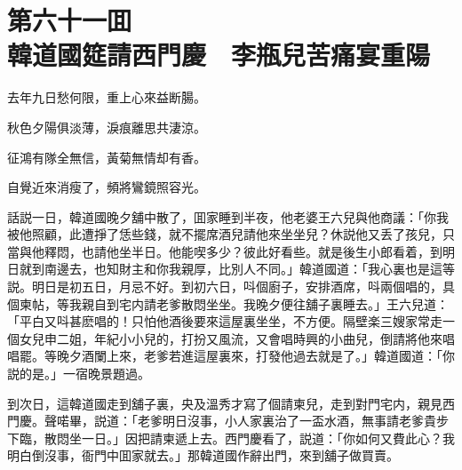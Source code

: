 
\chapter*{第六十一囬　\\韓道國筵請西門慶　李瓶兒苦痛宴重陽}


\begin{myquote}
去年九日愁何限，重上心來益断腸。

秋色夕陽俱淡薄，淚痕離思共淒涼。

征鴻有隊全無信，黃菊無情却有香。

自覺近來消瘦了，頻將鸞鏡照容光。
\end{myquote}

話説一日，韓道國晚夕舖中散了，囬家睡到半夜，他老婆王六兒與他商議：「你我被他照顧，此遭掙了恁些錢，就不擺席酒兒請他來坐坐兒？休説他又丢了孩兒，只當與他釋悶，也請他坐半日。他能喫多少？彼此好看些。就是後生小郎看着，到明日就到南邊去，也知財主和你我親厚，比別人不同。」韓道國道：「我心裏也是這等説。明日是初五日，月忌不好。到初六日，呌個廚子，安排酒席，呌兩個唱的，具個柬帖，等我親自到宅内請老爹散悶坐坐。我晚夕便往舖子裏睡去。」王六兒道：「平白又呌甚麽唱的！只怕他酒後要來這屋裏坐坐，不方便。隔壁楽三嫂家常走一個女兒申二姐，年紀小小兒的，打扮又風流，又會唱時興的小曲兒，倒請將他來唱唱罷。等晚夕酒闌上來，老爹若進這屋裏來，打發他過去就是了。」韓道國道：「你説的是。」一宿晚景題過。

到次日，這韓道國走到舖子裏，央及溫秀才寫了個請柬兒，走到對門宅内，親見西門慶。聲喏畢，説道：「老爹明日沒事，小人家裏治了一盃水酒，無事請老爹貴步下臨，散悶坐一日。」因把請柬遞上去。西門慶看了，説道：「你如何又費此心？我明白倒沒事，衙門中囬家就去。」那韓道國作辭出門，來到舖子做買賣。

